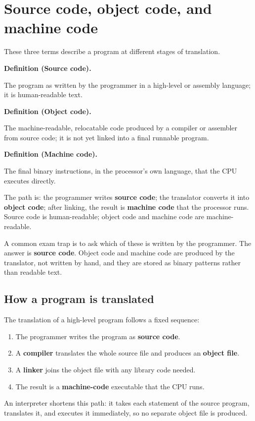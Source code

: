 \documentclass[11pt]{article}
\newenvironment{definitionbox}[1]{%
  \par\noindent\textbf{Definition (#1).}\ \itshape
}{\par\vspace{0.3em}}
\begin{document}
\section{Source code, object code, and machine code}
These three terms describe a program at different stages of translation.

\begin{definitionbox}{Source code}
The program as written by the programmer in a high-level or assembly language;
it is human-readable text.
\end{definitionbox}

\begin{definitionbox}{Object code}
The machine-readable, relocatable code produced by a compiler or assembler
from source code; it is not yet linked into a final runnable program.
\end{definitionbox}

\begin{definitionbox}{Machine code}
The final binary instructions, in the processor's own language, that the CPU
executes directly.
\end{definitionbox}

The path is: the programmer writes \textbf{source code}; the translator
converts it into \textbf{object code}; after linking, the result is
\textbf{machine code} that the processor runs. Source code is human-readable;
object code and machine code are machine-readable.

A common exam trap is to ask which of these is written by the programmer. The
answer is \textbf{source code}. Object code and machine code are produced by
the translator, not written by hand, and they are stored as binary patterns
rather than readable text.

\subsection*{How a program is translated}
The translation of a high-level program follows a fixed sequence:
\begin{enumerate}[label=\arabic*.]
  \item The programmer writes the program as \textbf{source code}.
  \item A \textbf{compiler} translates the whole source file and produces an
    \textbf{object file}.
  \item A \textbf{linker} joins the object file with any library code needed.
  \item The result is a \textbf{machine-code} executable that the CPU runs.
\end{enumerate}
An interpreter shortens this path: it takes each statement of the source
program, translates it, and executes it immediately, so no separate object
file is produced.
\end{document}
